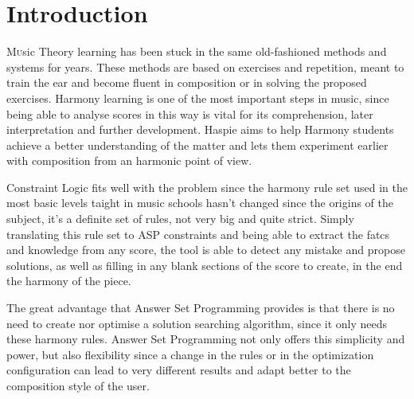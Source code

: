 \chapter{Introduction}
\label{chap:introduction}


\lettrine{M}usic Theory learning has been stuck in the same old-fashioned methods and systems for years. These methods are based on exercises and repetition, meant to train the ear and become fluent in composition or in solving the proposed exercises. Harmony learning is one of the most important steps in music, since being able to analyse scores in this way is vital for its comprehension, later interpretation and further development. Haspie aims to help Harmony students achieve a better understanding of the matter and lets them experiment earlier with composition from an harmonic point of view.

Constraint Logic fits well with the problem since the harmony rule set used in the most basic levels taight in music schools hasn't changed since the origins of the subject, it's a definite set of rules, not very big and quite strict. Simply translating this rule set to ASP constraints and being able to extract the fatcs and knowledge from any score, the tool is able to detect any mistake and propose solutions, as well as filling in any blank sections of the score to create, in the end the harmony of the piece.

The great advantage that Answer Set Programming provides is that there is no need to create nor optimise a solution searching algorithm, since it only needs these harmony rules. Answer Set Programming not only offers this simplicity and power, but also flexibility since a change in the rules or in the optimization configuration can lead to very different results and adapt better to the composition style of the user.

 
